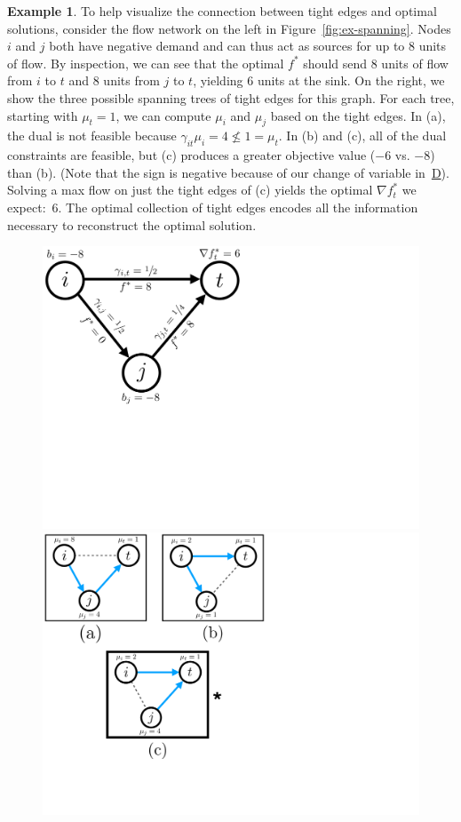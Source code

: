 \documentclass[11pt]{article}
\theoremstyle{definition}
\theoremstyle{definition}
\theoremstyle{definition}
\newtheorem{example}{Example}[section]
\begin{document}
	\begin{example}
		To help visualize the connection between tight edges and optimal solutions, 
	consider the flow network on the left in 
	Figure~\ref{fig:ex-spanning}. Nodes $i$ and $j$ both have negative demand and can
	thus act as sources for up to 8 units of flow. By inspection, we can see that the optimal $f^{*}$
	should send 8 units of flow from $i$ to $t$ and 8 units from $j$ to $t$,
	yielding 6 units at the sink. On the right, we show the three possible spanning
	trees of tight edges for this graph.
	For each tree, starting with $\mu_t = 1$, we can compute $\mu_i$
	and $\mu_j$ based on the tight edges. In (a), the dual is not feasible because
	$\gamma_{it}\mu_i = 4 \nleq 1 = \mu_t$.
	In (b) and (c), all of the dual constraints are feasible,
	but (c) produces a greater objective value ($-6$ vs. $-8$)
	than (b). (Note that the sign is negative because of our change of variable
	in~\hyperref[eqn:dual]{D}). Solving a max flow on just the tight edges of (c)
	yields the optimal $\nabla f_t^{*}$ we expect:~6.
  The optimal collection of tight edges encodes all the information necessary
	to reconstruct the optimal solution.
	\begin{figure}[h]
	\centering
	\begin{minipage}{.49\textwidth}
		\centering
		\includegraphics[width=0.8\linewidth]{figs/tight}
	\end{minipage}
	\begin{minipage}{.49\textwidth}
		\centering
		\includegraphics[width=.75\linewidth]{figs/tight-span-2}

\end{minipage}
\end{figure}
\end{example}
\end{document}
